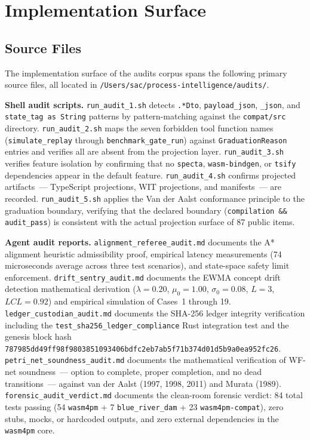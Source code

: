 
\section{Implementation Surface}
\label{sec:audits-impl}

\subsection{Source Files}
\label{sec:audits-impl-sources}

The implementation surface of the audits corpus spans the following primary source
files, all located in \texttt{/Users/sac/process-intelligence/audits/}.

\textbf{Shell audit scripts.} \texttt{run\_audit\_1.sh} detects \texttt{.*Dto},
\texttt{payload\_json}, \texttt{\_json}, and \texttt{state\_tag as String}
patterns by pattern-matching against the \texttt{compat/src} directory.
\texttt{run\_audit\_2.sh} maps the seven forbidden tool function names
(\texttt{simulate\_replay} through \texttt{benchmark\_gate\_run}) against
\texttt{GraduationReason} entries and verifies all are absent from the projection
layer. \texttt{run\_audit\_3.sh} verifies feature isolation by confirming that no
\texttt{specta}, \texttt{wasm-bindgen}, or \texttt{tsify} dependencies appear in
the default feature. \texttt{run\_audit\_4.sh} confirms projected artifacts~---
TypeScript projections, WIT projections, and manifests~--- are recorded.
\texttt{run\_audit\_5.sh} applies the Van der Aalst conformance principle to the
graduation boundary, verifying that the declared boundary (\texttt{compilation
\&\& audit\_pass}) is consistent with the actual projection surface of 87 public
items.

\textbf{Agent audit reports.} \texttt{alignment\_referee\_audit.md} documents the
A* alignment heuristic admissibility proof, empirical latency measurements (74
microseconds average across three test scenarios), and state-space safety limit
enforcement. \texttt{drift\_sentry\_audit.md} documents the EWMA concept drift
detection mathematical derivation (\(\lambda = 0.20\), \(\mu_0 = 1.00\), \(\sigma_0
= 0.08\), \(L = 3\), \(LCL = 0.92\)) and empirical simulation of Cases~1 through
19. \texttt{ledger\_custodian\_audit.md} documents the SHA-256 ledger integrity
verification including the \texttt{test\_sha256\_ledger\_compliance} Rust
integration test and the genesis block hash
\texttt{787985dd49ff98f9803851093406bdfc2eb7ab5f71b374d01d5b9a0ea952fc26}.
\texttt{petri\_net\_soundness\_audit.md} documents the mathematical verification
of WF-net soundness~--- option to complete, proper completion, and no dead
transitions~--- against van der Aalst (1997, 1998, 2011) and Murata (1989).
\texttt{forensic\_audit\_verdict.md} documents the clean-room forensic verdict:
84 total tests passing (54 \texttt{wasm4pm} + 7 \texttt{blue\_river\_dam} + 23
\texttt{wasm4pm-compat}), zero stubs, mocks, or hardcoded outputs, and zero
external dependencies in the \texttt{wasm4pm} core.

